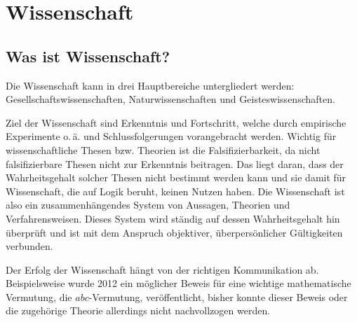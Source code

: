\section{Wissenschaft}
\subsection{Was ist Wissenschaft?}
Die Wissenschaft kann in drei Hauptbereiche untergliedert werden:
 Gesellschaftswissenschaften,  Naturwissenschaften und Geisteswissenschaften.

\noindent Ziel der Wissenschaft sind Erkenntnis und Fortschritt, welche durch empirische Experimente o.\,ä. und Schlussfolgerungen vorangebracht werden. Wichtig für wissenschaftliche Thesen bzw. Theorien ist die Falsifizierbarkeit, da nicht falsifizierbare Thesen nicht zur Erkenntnis beitragen. Das liegt daran, dass der Wahrheitsgehalt solcher Thesen nicht bestimmt werden kann und sie damit für Wissenschaft, die auf Logik beruht, keinen Nutzen haben.
Die Wissenschaft ist also ein zusammenhängendes System von Aussagen, Theorien und Verfahrensweisen.
Dieses System wird ständig auf dessen Wahrheitsgehalt hin überprüft und ist mit dem Anspruch objektiver, überpersönlicher Gültigkeiten verbunden.

\noindent Der Erfolg der Wissenschaft hängt von der richtigen Kommunikation ab. Beispielsweise wurde 2012 ein möglicher Beweis für eine wichtige mathematische Vermutung, die $abc$-Vermutung, veröffentlicht, bisher konnte dieser Beweis oder die zugehörige Theorie allerdings nicht nachvollzogen werden.\\
